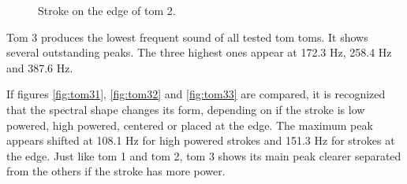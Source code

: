 \begin{figure}
	\centering
	\caption{Stroke on the edge of tom 2.}
	\label{fig:tom23}
\end{figure}


Tom 3 produces the lowest frequent sound of all tested tom toms. It shows several outstanding peaks. The three highest ones appear at 172.3 Hz, 258.4 Hz and 387.6 Hz. 

If figures \ref{fig:tom31}, \ref{fig:tom32} and \ref{fig:tom33} are compared, it is recognized that the spectral shape changes its form, depending on if the stroke is low powered, high powered, centered or placed at the edge. The maximum peak appears shifted at 108.1 Hz for high powered strokes and 151.3 Hz for strokes at the edge. Just like tom 1 and tom 2, tom 3 shows its main peak clearer separated from the others if the stroke has more power. 

